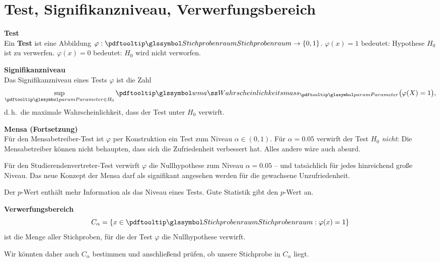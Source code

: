 
\section{Test, Signifikanzniveau, Verwerfungsbereich}\label{sec:test-signifikanzniveau-verwerfungsbereich}

\begin{defi}
    \textbf{Test}  \\
    Ein \textbf{Test} ist eine Abbildung $\varphi : \spr \to \{0,1\}$. $\varphi(x)=1$ bedeutet: Hypothese $H_0$ ist
    zu verwerfen. $\varphi(x)=0$ bedeutet: $H_0$ wird nicht verworfen.
\end{defi}

\begin{defi}
    \textbf{Signifikanzniveau}  \\
    Das Signifikanzniveau eines Tests $\varphi$ ist die Zahl
    \[
        \sup_{\param \in H_0} \pe_{\param}\big( \varphi(X) = 1 \big),
    \]
    d.\,h.\ die maximale Wahrscheinlichkeit, dass der Test unter $H_0$ verwirft.
\end{defi}

\begin{bsp}
    \textbf{Mensa (Fortsetzung)}  \\
    Für den Mensabetreiber-Test ist $\varphi$ per Konstruktion ein Test zum Niveau $\alpha \in (0,1)$.
    Für
    $\alpha=0.05$ verwirft der Test $H_0$ \emph{nicht}: Die Mensabetreiber können nicht behaupten, dass sich die
    Zufriedenheit verbessert hat.
    Alles andere wäre auch absurd.

    Für den Studierendenvertreter-Test verwirft $\varphi$ die Nullhypothese zum Niveau $\alpha=0.05$ -- und
    tatsächlich für jedes hinreichend große Niveau.
    Das neue Konzept der Mensa darf als signifikant angesehen
    werden für die gewachsene Unzufriedenheit.
\end{bsp}

Der $p$-Wert enthält mehr Information als das Niveau eines Tests.
Gute Statistik gibt den $p$-Wert an.

\begin{bem}
    \textbf{Verwerfungsbereich}  \\
    \[
        C_\alpha = \{ x \in \spr : \varphi(x)=1 \}
    \]
    ist die Menge aller Stichproben, für die der Test $\varphi$ die Nullhypothese verwirft.

    Wir könnten daher auch $C_\alpha$ bestimmen und anschließend prüfen, ob unsere Stichprobe in $C_\alpha$ liegt.
\end{bem}

